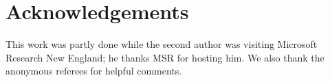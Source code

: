 \documentclass[11pt]{article}
\begin{document}
\section*{Acknowledgements} This work was partly done while the second author was visiting Microsoft Research New England; he thanks MSR for hosting him. We also thank the anonymous referees for helpful comments.





\end{document}
